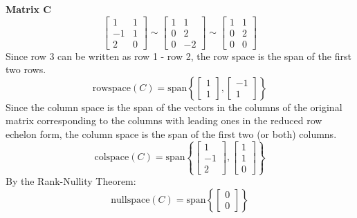 \documentclass{article}
\begin{document}
\noindent\textbf{Matrix C}
$$
\begin{bmatrix} 1 & 1 \\ -1 & 1 \\ 2 & 0 \end{bmatrix} \sim
\begin{bmatrix} 1 & 1 \\ 0 & 2 \\ 0 & -2 \end{bmatrix} \sim
\begin{bmatrix} 1 & 1 \\ 0 & 2 \\ 0 & 0 \end{bmatrix}
$$
Since row 3 can be written as row 1 - row 2, the row space is the span of the first two rows.
$$ \text{rowspace}(C) = \text{span}\left\{ \begin{bmatrix} 1 \\ 1 \end{bmatrix}, \begin{bmatrix} -1 \\ 1 \end{bmatrix} \right\} $$
Since the column space is the span of the vectors in the columns of the original matrix corresponding to the columns with leading ones in the reduced row echelon form, 
the column space is the span of the first two (or both) columns.
$$ \text{colspace}(C) = \text{span}\left\{ \begin{bmatrix} 1 \\ -1 \\ 2 \end{bmatrix}, \begin{bmatrix} 1 \\ 1 \\ 0 \end{bmatrix} \right\} $$
By the Rank-Nullity Theorem:
$$ \text{nullspace}(C) = \text{span}\left\{ \begin{bmatrix} 0 \\ 0 \end{bmatrix} \right\} $$
\end{document}
